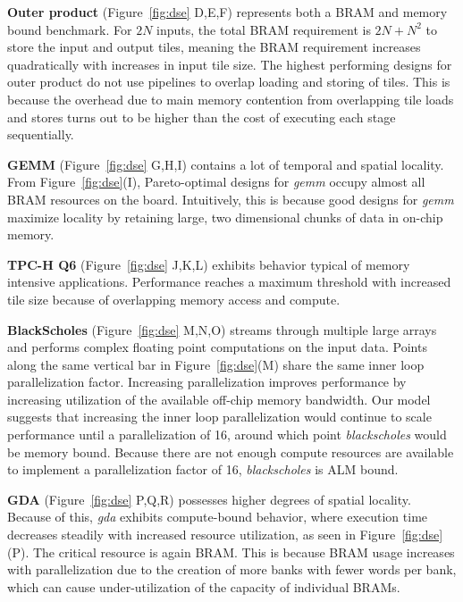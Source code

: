 \textbf{Outer product} (Figure~\ref{fig:dse} D,E,F) represents both a BRAM and memory bound benchmark. For $2N$ inputs,
the total BRAM requirement is $2N + N^2$ to store the input and output tiles, meaning the BRAM requirement
increases quadratically with increases in input tile size. The highest performing designs for outer product do not use
pipelines to overlap loading and storing of tiles. This is because the overhead due to main memory contention from overlapping
tile loads and stores turns out to be higher than the cost of executing each stage sequentially.

\textbf{GEMM} (Figure~\ref{fig:dse} G,H,I) contains a lot of temporal and spatial locality. From Figure~\ref{fig:dse}(I), Pareto-optimal designs for \emph{gemm}
occupy almost all BRAM resources on the board. Intuitively, this is  because good designs for \emph{gemm}
maximize locality by retaining large, two dimensional chunks of data in on-chip memory.

\textbf{TPC-H Q6} (Figure~\ref{fig:dse} J,K,L) exhibits behavior typical of memory intensive applications. Performance reaches a maximum threshold
with increased tile size because of overlapping memory access and compute.

\textbf{BlackScholes} (Figure~\ref{fig:dse} M,N,O) streams through multiple large arrays and performs complex floating point computations
on the input data. Points along the same vertical bar in Figure~\ref{fig:dse}(M) share the same inner loop parallelization
factor. Increasing parallelization improves performance by increasing utilization of the available off-chip memory bandwidth.
Our model suggests that increasing the inner loop parallelization would continue to scale
performance until a parallelization of 16, around which point \emph{blackscholes} would be memory bound. Because there are not enough compute resources are available to implement a parallelization factor of 16, \emph{blackscholes} is ALM bound.

\textbf{GDA} (Figure~\ref{fig:dse} P,Q,R) possesses higher degrees of spatial locality. Because of this, \emph{gda} exhibits compute-bound behavior, where execution time
decreases steadily with increased resource utilization, as seen in Figure~\ref{fig:dse}(P). The critical resource is again BRAM. This is because BRAM usage increases with parallelization due to the creation of
more banks with fewer words per bank, which can cause under-utilization of the capacity of individual BRAMs.

